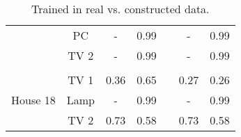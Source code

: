 \begin{table}[H]
\begin{tabular}{ccccccc}
\multicolumn{1}{|c|}{}                          & \multicolumn{1}{c|}{PC}     & \multicolumn{1}{c|}{-}    & \multicolumn{1}{c|}{0.99}     & \multicolumn{1}{c|}{} & \multicolumn{1}{c|}{-}    & \multicolumn{1}{c|}{0.99}     \\ \cline{2-4} \cline{6-7} 
\multicolumn{1}{|c|}{}                          & \multicolumn{1}{c|}{TV 2}   & \multicolumn{1}{c|}{-}    & \multicolumn{1}{c|}{0.99}     & \multicolumn{1}{c|}{} & \multicolumn{1}{c|}{-}    & \multicolumn{1}{c|}{0.99}     \\ \cline{1-4} \cline{6-7} 
\multicolumn{1}{l}{}                            &                             &                           &                               &                       &                           &                               \\ \cline{1-4} \cline{6-7} 
\multicolumn{1}{|c|}{\multirow{3}{*}{House 18}} & \multicolumn{1}{c|}{TV 1}   & \multicolumn{1}{c|}{0.36} & \multicolumn{1}{c|}{0.65}     & \multicolumn{1}{c|}{} & \multicolumn{1}{c|}{0.27} & \multicolumn{1}{c|}{0.26}     \\ \cline{2-4} \cline{6-7} 
\multicolumn{1}{|c|}{}                          & \multicolumn{1}{c|}{Lamp}   & \multicolumn{1}{c|}{-}    & \multicolumn{1}{c|}{0.99}     & \multicolumn{1}{c|}{} & \multicolumn{1}{c|}{-}    & \multicolumn{1}{c|}{0.99}     \\ \cline{2-4} \cline{6-7} 
\multicolumn{1}{|c|}{}                          & \multicolumn{1}{c|}{TV 2}   & \multicolumn{1}{c|}{0.73} & \multicolumn{1}{c|}{0.58}     & \multicolumn{1}{c|}{} & \multicolumn{1}{c|}{0.73} & \multicolumn{1}{c|}{0.58}     \\ \cline{1-4} \cline{6-7} 
\end{tabular}                         
\caption{Trained in real vs. constructed data.}                     
\label{table:Tab:RealVsCon}                    
\end{table}  
